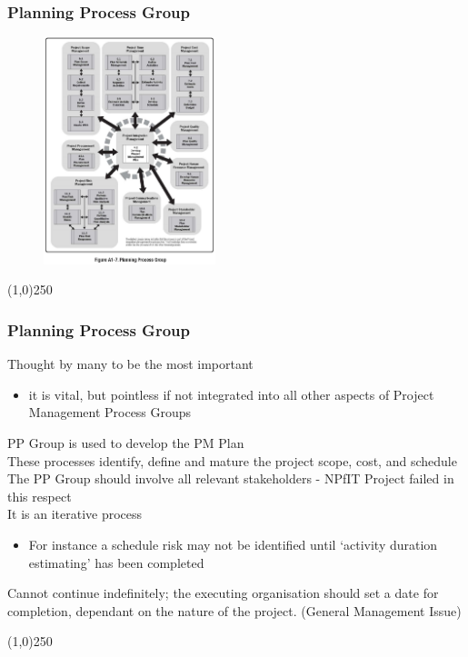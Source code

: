 \begin{frame}
\frametitle{Planning Process Group}
 \begin{figure}
 	\centering
 		\includegraphics[width = 5cm]{images/FigA1-7.jpg}
 	\label{fig:A1-7}
 \end{figure}
\end{frame}
\begin{center}\line(1,0){250}\end{center}



\begin{frame}
\frametitle{Planning Process Group}
Thought by many to be the most important\\
\begin{itemize}
	\item it is vital, but pointless if not integrated into all other aspects of Project Management Process Groups
\end{itemize}
PP Group is used to develop the PM Plan\\
These processes identify, define and mature the project scope, cost, and schedule\\
The PP Group should involve all relevant stakeholders - NPfIT Project failed in this respect\\
It is an iterative process\\
\begin{itemize}
	\item For instance a schedule risk may not be identified until `activity duration estimating' has been completed
\end{itemize}
Cannot continue indefinitely; the executing organisation should set a date for completion, dependant on the nature of the project. (General Management Issue)\\
\end{frame}
\begin{center}\line(1,0){250}\end{center}



